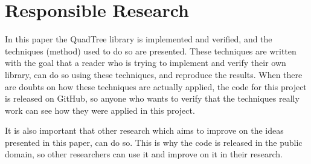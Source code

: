 \section{Responsible Research}
In this paper the QuadTree library is implemented and verified, and the techniques (method) used to do so are presented. These techniques are written with the goal that a reader who is trying to implement and verify their own library, can do so using these techniques, and reproduce the results. When there are doubts on how these techniques are actually applied, the code for this project is released on GitHub, so anyone who wants to verify that the techniques really work can see how they were applied in this project.

It is also important that other research which aims to improve on the ideas presented in this paper, can do so. This is why the code is released in the public domain, so other researchers can use it and improve on it in their research.